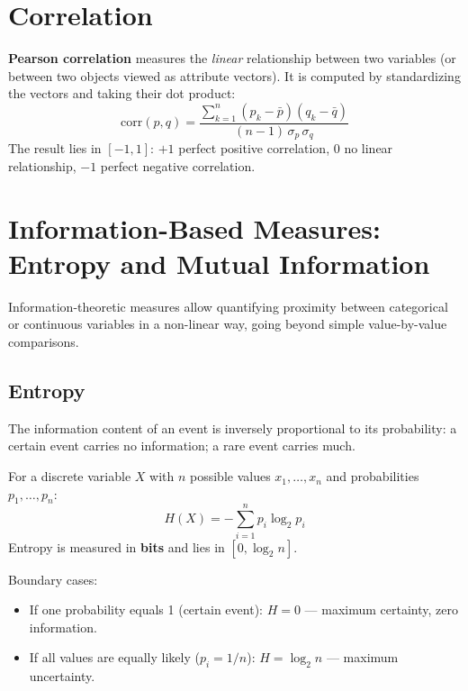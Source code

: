 \section{Correlation}
\label{sec:correlation}

\textbf{Pearson correlation} measures the \textit{linear} relationship between two variables (or between two objects viewed as attribute vectors). It is computed by standardizing the vectors and taking their dot product:
\begin{equation}
  \mathrm{corr}(p, q) = \frac{\sum_{k=1}^{n}(p_k - \bar{p})(q_k - \bar{q})}{(n-1)\,\sigma_p\,\sigma_q}
  \label{eq:pearson}
\end{equation}
The result lies in $[-1, 1]$: $+1$ perfect positive correlation, $0$ no linear relationship, $-1$ perfect negative correlation.

\section{Information-Based Measures: Entropy and Mutual Information}
\label{sec:entropy}

Information-theoretic measures allow quantifying proximity between categorical or continuous variables in a non-linear way, going beyond simple value-by-value comparisons.

\subsection{Entropy}

The information content of an event is inversely proportional to its probability: a certain event carries no information; a rare event carries much.

\begin{definition}
For a discrete variable $X$ with $n$ possible values $x_1, \ldots, x_n$ and probabilities $p_1, \ldots, p_n$:
\begin{equation}
  H(X) = -\sum_{i=1}^{n} p_i \log_2 p_i
  \label{eq:entropy}
\end{equation}
Entropy is measured in \textbf{bits} and lies in $[0, \log_2 n]$.
\end{definition}

Boundary cases:
\begin{itemize}
  \item If one probability equals 1 (certain event): $H = 0$ — maximum certainty, zero information.
  \item If all values are equally likely ($p_i = 1/n$): $H = \log_2 n$ — maximum uncertainty.
\end{itemize}

